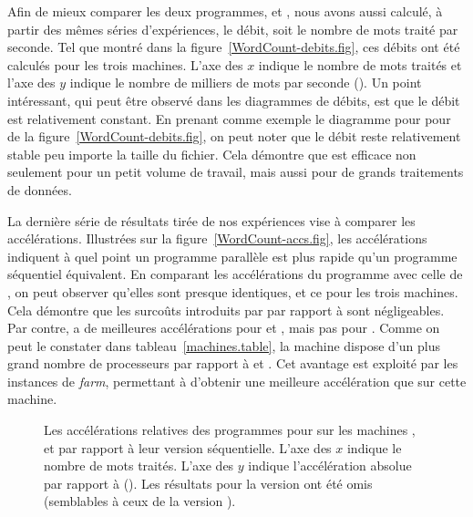 Afin de mieux comparer les deux programmes,  et , nous avons aussi calculé, à partir des mêmes séries d'exp\'eriences, le d\'ebit, soit le nombre de mots trait\'e par seconde. Tel que montr\'e dans la figure~\ref{WordCount-debits.fig}, ces débits ont \'et\'e calculés pour les trois machines. L'axe des $x$ indique le nombre de mots trait\'es et l'axe des $y$ indique le nombre de milliers de mots par seconde (). Un point int\'eressant, qui peut \^etre observ\'e dans les diagrammes de d\'ebits, est que le d\'ebit est relativement constant. En prenant comme exemple le diagramme pour  pour  de la figure~\ref{WordCount-debits.fig}, on peut noter que le d\'ebit reste relativement stable peu importe la taille du fichier. Cela d\'emontre que  est efficace non seulement pour un petit volume de travail, mais aussi pour de grands traitements de donn\'ees.


La derni\`ere s\'erie de résultats tirée de nos exp\'eriences vise \`a comparer les acc\'el\'erations. Illustr\'ees sur la figure~\ref{WordCount-accs.fig}, les acc\'el\'erations indiquent \`a quel point un programme parall\`ele est plus rapide qu'un programme s\'equentiel \'equivalent. En comparant les acc\'el\'erations du programme  avec celle de , on peut observer qu'elles sont presque identiques, et ce pour les trois machines. Cela d\'emontre que les surco\^uts introduits par  par rapport \`a  sont n\'egligeables. Par contre,  a de meilleures acc\'el\'erations pour  et , mais pas pour . Comme on peut le constater dans tableau~\ref{machines.table}, la machine  dispose d'un plus grand nombre de processeurs par rapport \`a  et . Cet avantage est exploit\'e par les instances de \emph{farm}, permettant \`a  d'obtenir une meilleure acc\'el\'eration que  sur cette machine.




\begin{figure}



\caption[Les accélérations \emph{relatives} pour  sur les machines ,
 et .]{Les accélérations relatives des programmes pour  sur
les machines ,  et  par rapport à leur version séquentielle. L'axe des $x$ indique le nombre de mots
traités. L'axe des $y$ indique l'accélération absolue par rapport à
 (). Les résultats pour la version
 ont été omis (semblables à ceux de la version \ppff).}
\label{WordCount-accsrel.fig}
\end{figure}


